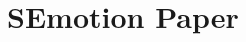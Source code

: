 \chapter[SEmotion Paper]
{SEmotion Paper}%
\label{ch:semotion2020}
\graphicspath{{mainmatter/publications/figures/semotion2020/}}

